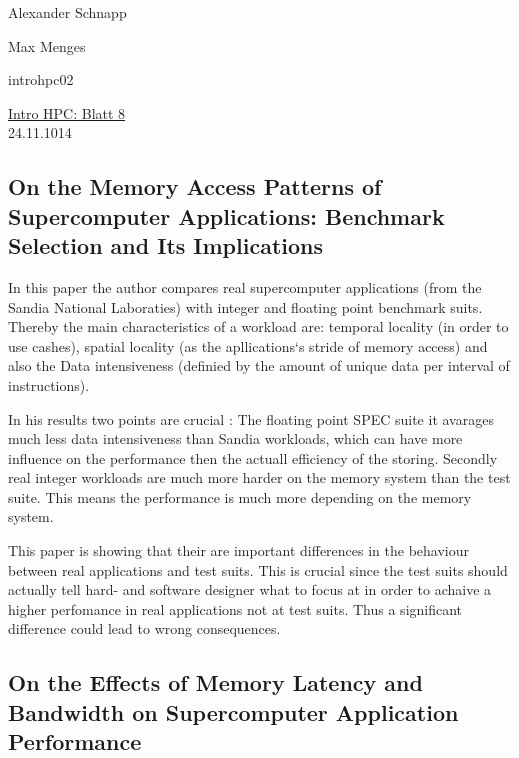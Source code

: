 \documentclass[a4paper,11pt]{scrartcl}
\begin{document}
\hfill Alexander Schnapp

\hfill Max Menges

\hfill introhpc02

\begin{center}
\underline{\Huge{Intro HPC: Blatt 8}}\\
\large{24.11.1014}\\
\end{center}


\subsection{On the Memory Access Patterns of Supercomputer Applications: Benchmark Selection and Its Implications}
In this paper the author compares real supercomputer applications (from the Sandia National Laboraties) with integer and floating point benchmark suits. Thereby the main characteristics of a workload are: temporal locality (in order to use cashes), spatial locality (as the apllications`s stride of memory access) and also the Data intensiveness (definied by the amount of unique data per interval of instructions).

In his results two points are crucial : The floating point SPEC suite it avarages much less data intensiveness than Sandia workloads, which can have more influence on the performance then the actuall efficiency of the storing. Secondly real integer workloads are much more harder on the memory system than the test suite. This means the performance is much more depending on the memory system.

This paper is showing that their are important differences in the behaviour between real applications and test suits. This is crucial since the test suits should actually tell hard- and software designer what to focus at in order to achaive a higher perfomance in real applications not at test suits. Thus a significant difference could lead to wrong consequences.


 \subsection{On the Effects of Memory Latency and Bandwidth on Supercomputer Application Performance}
\end{document}
